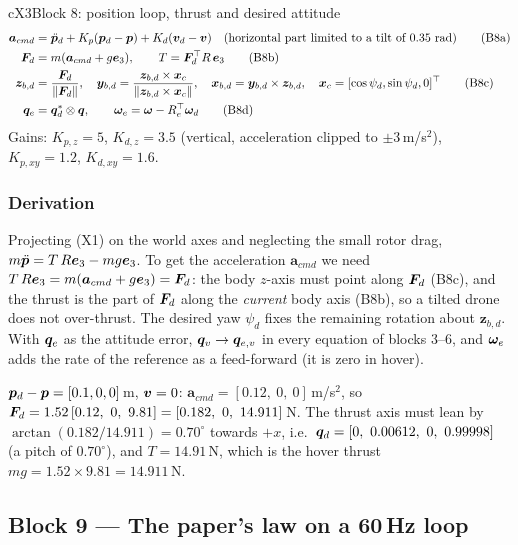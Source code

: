 \begin{eqbox}{cX3}{Block 8: position loop, thrust and desired attitude}
\begin{align}
\bm a_{cmd}&=\ddot{\bm{p}}_d+K_p(\bm{p}_d-\bm{p})+K_d(\bm{v}_d-\bm{v})\quad(\text{horizontal part limited to a tilt of }0.35\ \text{rad}) \tag{B8a}\\
\bm{F}_d&=m(\bm a_{cmd}+g\bm e_3),\qquad T=\bm{F}_d^\top R\,\bm e_3 \tag{B8b}\\
\bm z_{b,d}&=\frac{\bm{F}_d}{\|\bm{F}_d\|},\quad \bm y_{b,d}=\frac{\bm z_{b,d}\times\bm x_c}{\|\bm z_{b,d}\times\bm x_c\|},\quad
\bm x_{b,d}=\bm y_{b,d}\times\bm z_{b,d},\quad \bm x_c=[\cos\psi_d,\sin\psi_d,0]^\top \tag{B8c}\\
\bm{q}_e&=\bm{q}_d^*\otimes\bm{q},\qquad \bm{\omega}_e=\bm{\omega}-R_e^\top\bm{\omega}_d \tag{B8d}
\end{align}
Gains: $K_{p,z}=5$, $K_{d,z}=3.5$ (vertical, acceleration clipped to $\pm3$\,m/s$^2$), $K_{p,xy}=1.2$, $K_{d,xy}=1.6$.
\end{eqbox}

\subsubsection*{Derivation}
Projecting (X1) on the world axes and neglecting the small rotor drag, $m\ddot{\bm{p}}=T\,R\bm e_3-mg\bm e_3$. To get the
acceleration $\bm a_{cmd}$ we need $T\,R\bm e_3=m(\bm a_{cmd}+g\bm e_3)=\bm{F}_d$: the body $z$-axis must point along $\bm{F}_d$
(B8c), and the thrust is the part of $\bm{F}_d$ along the \emph{current} body axis (B8b), so a tilted drone does not
over-thrust. The desired yaw $\psi_d$ fixes the remaining rotation about $\bm z_{b,d}$. With $\bm{q}_e$ as the attitude error,
$\bm{q}_v\to\bm{q}_{e,v}$ in every equation of blocks 3--6, and $\bm{\omega}_e$ adds the rate of the reference as a feed-forward
(it is zero in hover).

\begin{toybox}
$\bm{p}_d-\bm{p}=[0.1,0,0]$\,m, $\bm{v}=0$: $\bm a_{cmd}=[0.12,\ 0,\ 0]$\,m/s$^2$, so
$\vF_d=1.52\,[0.12,\ 0,\ 9.81]=[0.182,\ 0,\ 14.911]$\,N. The thrust axis must lean by
$\arctan(0.182/14.911)=0.70^\circ$ towards $+x$, i.e.\ $\vq_d=[0,\ 0.00612,\ 0,\ 0.99998]$ (a pitch of $0.70^\circ$), and
$T=14.91$\,N, which is the hover thrust $mg=1.52\times9.81=14.911$\,N.
\end{toybox}

\subsection{Block 9 --- The paper's law on a 60\,Hz loop}
\label{sec:b9}


